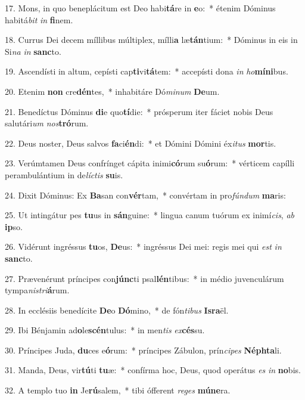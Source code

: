 17. Mons, in quo beneplácitum est Deo habi\textbf{tá}re in \textbf{e}o:~*  étenim Dóminus habitá\textit{bit} \textit{in} \textbf{fi}nem.\

18. Currus Dei decem míllibus múltiplex, mílli\textbf{a} læ\textbf{tán}tium:~*  Dóminus in eis in Si\textit{na} \textit{in} \textbf{sanc}to.\

19. Ascendísti in altum, cepísti cap\textbf{ti}vi\textbf{tá}tem:~*  accepísti dona \textit{in} \textit{ho}\textbf{mí}\textbf{ni}bus.\

20. Etenim \textbf{non} cre\textbf{dén}tes,~*  inhabitáre Dó\textit{mi}\textit{num} \textbf{De}um.\

21. Benedíctus Dóminus \textbf{di}e quo\textbf{tí}die:~*  prósperum iter fáciet nobis Deus salutári\textit{um} \textit{nos}\textbf{tró}rum.\

22. Deus noster, Deus salvos \textbf{fa}ci\textbf{én}di:~*  et Dómini Dómini éx\textit{i}\textit{tus} \textbf{mor}tis.\

23. Verúmtamen Deus confrínget cápita inimi\textbf{có}rum su\textbf{ó}rum:~*  vérticem capílli perambulántium in de\textit{líc}\textit{tis} \textbf{su}is.\

24. Dixit Dóminus: Ex \textbf{Ba}san con\textbf{vér}tam,~*  convértam in pro\textit{fún}\textit{dum} \textbf{ma}ris:\

25. Ut intingátur pes \textbf{tu}us in \textbf{sán}guine:~*  lingua canum tuórum ex inimí\textit{cis}, \textit{ab} \textbf{ip}so.\

26. Vidérunt ingréssus \textbf{tu}os, \textbf{De}us:~*  ingréssus Dei mei: regis mei qui \textit{est} \textit{in} \textbf{sanc}to.\

27. Prævenérunt príncipes con\textbf{júnc}ti psal\textbf{lén}tibus:~*  in médio juvenculárum tympa\textit{nis}\textit{tri}\textbf{á}rum.\

28. In ecclésiis benedícite \textbf{De}o \textbf{Dó}mino,~*  de fón\textit{ti}\textit{bus} \textbf{Is}\textbf{ra}ël.\

29. Ibi Bénjamin ad\textbf{o}le\textbf{scén}tulus:~*  in men\textit{tis} \textit{ex}\textbf{cés}su.\

30. Príncipes Juda, \textbf{du}ces e\textbf{ó}rum:~*  príncipes Zábulon, prín\textit{ci}\textit{pes} \textbf{Néph}\textbf{ta}li.\

31. Manda, Deus, vir\textbf{tú}ti \textbf{tu}æ:~*  confírma hoc, Deus, quod operátus \textit{es} \textit{in} \textbf{no}bis.\

32. A templo tuo \textbf{in} Je\textbf{rú}salem,~*  tibi ófferent \textit{re}\textit{ges} \textbf{mú}\textbf{ne}ra.\

